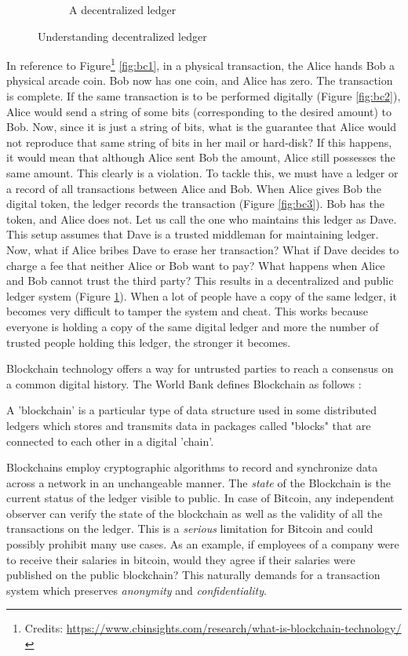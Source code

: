 \begin{figure}[h!]
\begin{subfigure}[b]{0.7\textwidth}
        \caption{A decentralized ledger}
        \label{fig:bc4}
    \end{subfigure}
    \caption{Understanding decentralized ledger}
    \label{fig:bc}
\end{figure}

In reference to Figure\footnote{Credits: \url{https://www.cbinsights.com/research/what-is-blockchain-technology/}}
\ref{fig:bc1}, in a physical transaction, the Alice hands Bob a physical arcade coin. Bob now has one coin, and Alice has zero. The transaction is complete. 
If the same transaction is to be performed digitally (Figure \ref{fig:bc2}), Alice would send a string of some bits (corresponding to the desired amount) to Bob. 
Now, since it is just a string of bits, what is the guarantee that Alice would not reproduce that same string of bits in her mail or hard-disk?
If this happens, it would mean that although Alice sent Bob the amount, Alice still possesses the same amount. 
This clearly is a violation.
To tackle this, we must have a ledger or a record of all transactions between Alice and Bob. 
When Alice gives Bob the digital token, the ledger records the transaction (Figure \ref{fig:bc3}). 
Bob has the token, and Alice does not. Let us call the one who maintains this ledger as Dave.
This setup assumes that Dave is a trusted middleman for maintaining ledger. 
Now, what if Alice bribes Dave to erase her transaction? What if Dave decides to charge a fee that neither Alice or Bob want to pay? 
What happens when Alice and Bob cannot trust the third party? This results in a decentralized and public ledger system (Figure \ref{fig:bc4}). 
When a lot of people have a copy of the same ledger, it becomes very difficult to tamper the system and cheat. 
This works because everyone is holding a copy of the same digital ledger and more the number of trusted people holding this ledger, the stronger it becomes.


Blockchain technology offers a way for untrusted parties to reach a consensus on a common digital history. The World Bank defines Blockchain as follows \cite{natar17}:

\begin{definition}[Blockchain]
    A 'blockchain' is a particular type of data structure used in some distributed ledgers
    which stores and transmits data in packages called "blocks" that are connected to each
    other in a digital 'chain'. 
\end{definition}

Blockchains employ cryptographic algorithms to record and synchronize data across a network in an unchangeable manner. The \textit{state} of the Blockchain is the current status of the ledger visible to public. 
In case of Bitcoin, any independent observer can verify the state of the blockchain as well as the validity of all the transactions on the ledger.
This is a \textit{serious} limitation for Bitcoin and could possibly prohibit many use cases.
As an example, if employees of a company were to receive their salaries in bitcoin, would they agree if their salaries were published on the public blockchain? 
This naturally demands for a transaction system which preserves \textit{anonymity} and \textit{confidentiality}.


